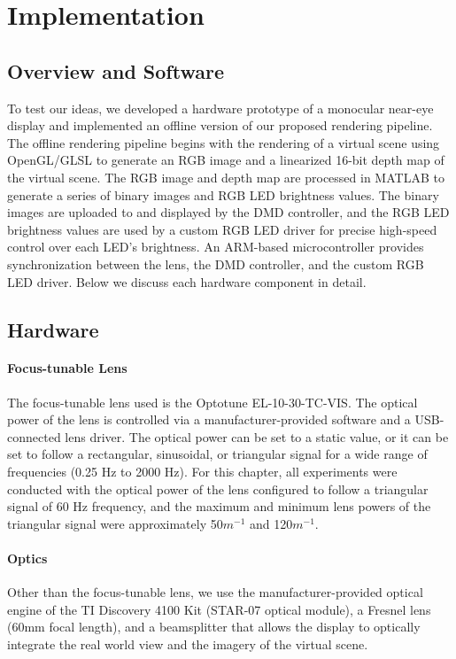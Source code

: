 \section{Implementation}
\subsection{Overview and Software}
To test our ideas, we developed a hardware prototype of a monocular near-eye display and implemented an offline version of our proposed rendering pipeline. The offline rendering pipeline begins with the rendering of a virtual scene using OpenGL/GLSL to generate an RGB image and a linearized 16-bit depth map of the virtual scene. The RGB image and depth map are processed in MATLAB to generate a series of binary images and RGB LED brightness values. The binary images are uploaded to and displayed by the DMD controller, and the RGB LED brightness values are used by a custom RGB LED driver for precise high-speed control over each LED's brightness. An ARM-based microcontroller provides synchronization between the lens, the DMD controller, and the custom RGB LED driver. Below we discuss each hardware component in detail.



\subsection{Hardware}
\paragraph{Focus-tunable Lens} The focus-tunable lens used is the Optotune EL-10-30-TC-VIS. The optical power of the lens is controlled via a manufacturer-provided software and a USB-connected lens driver. The optical power can be set to a static value, or it can be set to follow a rectangular, sinusoidal, or triangular signal for a wide range of frequencies (0.25 Hz to 2000 Hz). For this chapter, all experiments were conducted with the optical power of the lens configured to follow a triangular signal of 60 Hz frequency, and the maximum and minimum lens powers of the triangular signal were approximately 50$m^{-1}$ and 120$m^{-1}$. 




\paragraph{Optics} Other than the focus-tunable lens, we use the manufacturer-provided optical engine of the TI Discovery 4100 Kit (STAR-07 optical module), a Fresnel lens (60mm focal length), and a beamsplitter that allows the display to optically integrate the real world view and the imagery of the virtual scene. 

